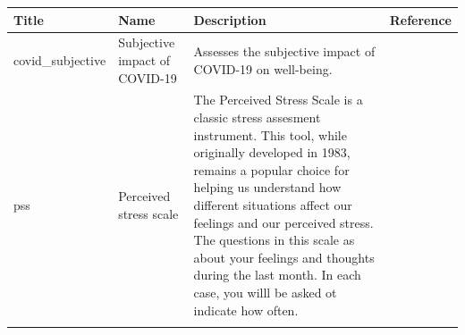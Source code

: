 \documentclass[]{book}
\begin{document}
\begin{longtable}[]{@{}llll@{}}
\toprule
\begin{minipage}[b]{0.22\columnwidth}\raggedright
Title\strut
\end{minipage} & \begin{minipage}[b]{0.27\columnwidth}\raggedright
Name\strut
\end{minipage} & \begin{minipage}[b]{0.22\columnwidth}\raggedright
Description\strut
\end{minipage} & \begin{minipage}[b]{0.18\columnwidth}\raggedright
Reference\strut
\end{minipage}\tabularnewline
\midrule
\endhead
\begin{minipage}[t]{0.22\columnwidth}\raggedright
covid\_subjective\strut
\end{minipage} & \begin{minipage}[t]{0.27\columnwidth}\raggedright
Subjective impact of COVID-19\strut
\end{minipage} & \begin{minipage}[t]{0.22\columnwidth}\raggedright
Assesses the subjective impact of COVID-19 on well-being.\strut
\end{minipage} & \begin{minipage}[t]{0.18\columnwidth}\raggedright
\strut
\end{minipage}\tabularnewline
\begin{minipage}[t]{0.22\columnwidth}\raggedright
pss\strut
\end{minipage} & \begin{minipage}[t]{0.27\columnwidth}\raggedright
Perceived stress scale\strut
\end{minipage} & \begin{minipage}[t]{0.22\columnwidth}\raggedright
The Perceived Stress Scale is a classic stress assesment instrument. This tool, while originally developed in 1983, remains a popular choice for helping us understand how different situations affect our feelings and our perceived stress. The questions in this scale as about your feelings and thoughts during the last month. In each case, you willl be asked ot indicate how often.\strut
\end{minipage} & \begin{minipage}[t]{0.18\columnwidth}\raggedright
\strut
\end{minipage}\tabularnewline
\begin{minipage}[t]{0.22\columnwidth}\raggedright

\end{minipage}
\end{longtable}
\end{document}
